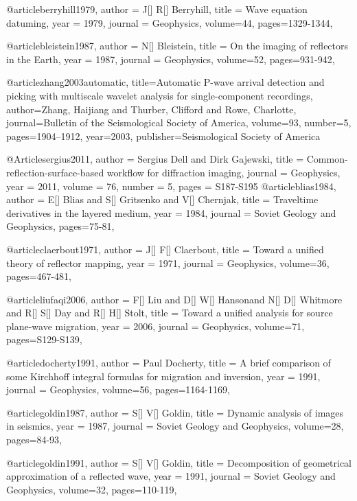 @article{berryhill1979,
  author =	 {J[] R[] Berryhill},
  title =	 {Wave equation datuming},
  year =	 1979,
  journal =	 {Geophysics},
  volume={44},
 pages=1329-1344,
}

@article{bleistein1987,
  author =	 {N[] Bleistein},
  title =	 {On the imaging of reflectors in the Earth},
  year =	 1987,
  journal =	 {Geophysics},
  volume={52},
 pages=931-942,
}

@article{zhang2003automatic,
  title={Automatic P-wave arrival detection and picking with multiscale wavelet analysis for single-component recordings},
  author={Zhang, Haijiang and Thurber, Clifford and Rowe, Charlotte},
  journal={Bulletin of the Seismological Society of America},
  volume={93},
  number={5},
  pages={1904--1912},
  year={2003},
  publisher={Seismological Society of America}
}

@Article{sergius2011,
  author =       {Sergius Dell and Dirk Gajewski},
  title =     {Common-reflection-surface-based workflow for diffraction imaging}, 
  journal = {Geophysics},
  year =         2011,
  volume =       76,
  number =       5,
  pages =        {S187-S195}
}
@article{blias1984,
  author =	 {E[] Blias and S[] Gritsenko and V[] Chernjak},
  title =	 {Traveltime derivatives in the layered medium},
  year =	 1984,
  journal =	 {Soviet Geology and Geophysics},
 pages=75-81,
}

@article{claerbout1971,
  author =	 {J[] F[] Claerbout},
  title =	 {Toward a unified theory of reflector mapping},
  year =	 1971,
  journal =	 {Geophysics},
  volume={36},
 pages=467-481,
}

@article{liufaqi2006,
  author =	 {F[] Liu and D[] W[] Hansonand N[] D[] Whitmore and R[] S[] Day and R[] H[] Stolt},
  title =	 {Toward a unified analysis for source plane-wave migration},
  year =	 2006,
  journal =	 {Geophysics},
  volume={71},
 pages=S129-S139,
}

@article{docherty1991,
  author =	 {Paul Docherty},
  title =	 {A brief comparison of some Kirchhoff integral formulas for migration and inversion},
  year =	 1991,
  journal =	 {Geophysics},
  volume={56},
 pages=1164-1169,
}

@article{goldin1987,
  author =	 {S[] V[] Goldin},
  title =	 {Dynamic analysis of images in seismics},
  year =	 1987,
  journal =	 {Soviet Geology and Geophysics},
  volume={28},
 pages=84-93,
}

@article{goldin1991,
  author =	 {S[] V[] Goldin},
  title =	 {Decomposition of geometrical approximation of a reflected wave},
  year =	 1991,
  journal =	 {Soviet Geology and Geophysics},
  volume={32},
 pages=110-119,
}

